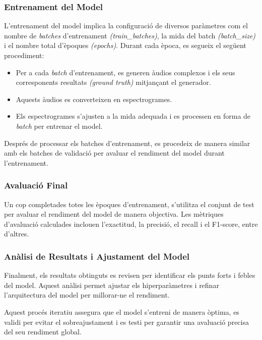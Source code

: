 \documentclass[10pt,a4paper,twocolumn,twoside]{article}
\begin{document}
\subsubsection{Entrenament del Model}

L'entrenament del model implica la configuració de diversos paràmetres com el nombre de \textit{batches} d'entrenament \textit{(train\_batches)}, la mida del batch \textit{(batch\_size)} i el nombre total d'èpoques \textit{(epochs)}. Durant cada època, es segueix el següent procediment:

\begin{itemize}
    \item Per a cada \textit{batch} d'entrenament, es generen àudios complexos i els seus corresponents resultats \textit{(ground truth)} mitjançant el generador.
    \item Aquests àudios es converteixen en espectrogrames.
    \item Els espectrogrames s'ajusten a la mida adequada i es processen en forma de \textit{batch} per entrenar el model.
\end{itemize}

Després de processar els batches d'entrenament, es procedeix de manera similar amb els batches de validació per avaluar el rendiment del model durant l'entrenament.

\subsubsection{Avaluació Final}

Un cop completades totes les èpoques d'entrenament, s'utilitza el conjunt de test per avaluar el rendiment del model de manera objectiva. Les mètriques d'avaluació calculades inclouen l'exactitud, la precisió, el recall i el F1-score, entre d'altres.

\subsubsection{Anàlisi de Resultats i Ajustament del Model}

Finalment, els resultats obtinguts es revisen per identificar els punts forts i febles del model. Aquest anàlisi permet ajustar els hiperparàmetres i refinar l'arquitectura del model per millorar-ne el rendiment.

Aquest procés iteratiu assegura que el model s'entreni de manera òptima, es validi per evitar el sobreajustament i es testi per garantir una avaluació precisa del seu rendiment global.
\end{document}
